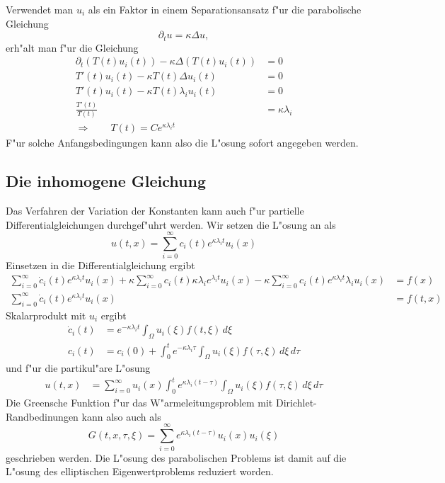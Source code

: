 Verwendet man $u_i$ als ein Faktor in einem Separationsansatz f"ur
die parabolische
Gleichung
$$\partial_tu=\kappa\Delta u,$$
erh"alt man f"ur die Gleichung
\begin{align*}
\partial_t (T(t)u_i(t))-\kappa\Delta(T(t)u_i(t))&=0
\\
T'(t)u_i(t)-\kappa T(t)\Delta u_i(t)&=0
\\
T'(t)u_i(t)-\kappa T(t)\lambda_i u_i(t)&=0
\\
\frac{T'(t)}{T(t)}&=\kappa\lambda_i
\\
\Rightarrow\qquad T(t)=Ce^{\kappa\lambda_it}
\end{align*}
F"ur solche Anfangsbedingungen kann also die L"osung sofort angegeben
werden.
\subsection{Die inhomogene Gleichung}
Das Verfahren der Variation der Konstanten kann auch f"ur partielle
Differentialgleichungen durchgef"uhrt werden. Wir setzen die L"osung
an als
$$u(t,x)=\sum_{i=0}^\infty c_i(t) e^{\kappa\lambda_i t}u_i(x)$$
Einsetzen in die Differentialgleichung ergibt
\begin{align*}
\sum_{i=0}^\infty \dot c_i(t)e^{\kappa\lambda_it}u_i(x)
+\kappa\sum_{i=0}^\infty c_i(t)\kappa\lambda_i e^{\lambda_it}u_i(x)
-\kappa\sum_{i=0}^\infty c_i(t)e^{\kappa\lambda_it}\lambda_iu_i(x)
&=f(x)
\\
\sum_{i=0}^\infty \dot c_i(t)e^{\kappa\lambda_it}u_i(x)
&=f(t,x)
\end{align*}
Skalarprodukt mit $u_i$ ergibt
\begin{align*}
\dot c_i(t)&= e^{-\kappa\lambda_it}\int_{\Omega}u_i(\xi)f(t,\xi)\,d\xi
\\
c_i(t)&=c_i(0)+\int_0^te^{-\kappa\lambda_i\tau}\int_{\Omega}u_i(\xi)f(\tau,\xi)\,d\xi\,d\tau
\end{align*}
und f"ur die partikul"are L"osung
\begin{align*}
u(t,x)&=
\sum_{i=0}^\infty
u_i(x)
\int_0^t
e^{\kappa\lambda_i(t-\tau)}\int_{\Omega}u_i(\xi)f(\tau,\xi)\,d\xi\,d\tau
\end{align*}
Die Greensche Funktion f"ur das W"armeleitungsproblem mit
Dirichlet-Randbedinungen kann also auch als
$$G(t,x,\tau,\xi)
=
\sum_{i=0}^\infty
e^{\kappa\lambda_i (t-\tau)}
u_i(x)
u_i(\xi)
$$
geschrieben werden. Die L"osung des parabolischen Problems ist damit
auf die L"osung des elliptischen Eigenwertproblems reduziert worden.


